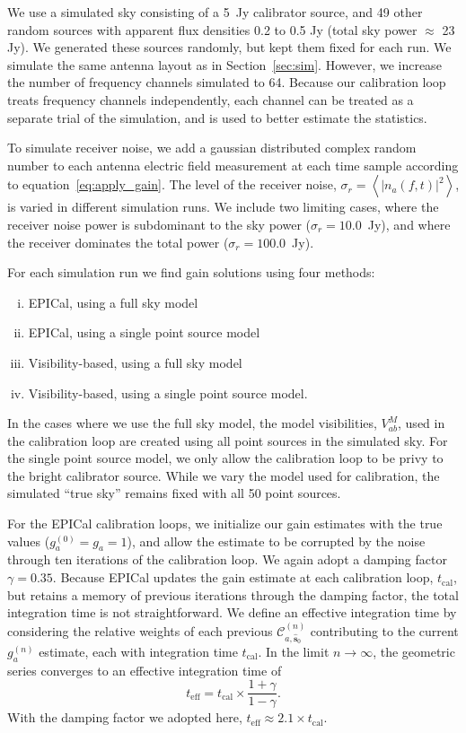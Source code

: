 \documentclass[a4paper,fleqn,usenatbib]{mnras}
\newcommand{\spix}{\ensuremath{\hat{\mathbf{s}}_{0}}}
\newcommand{\Cna}[1][n]{\ensuremath{\mathcal{C}^{(#1)}_{a,\spix}}}
\newcommand{\damp}{\ensuremath{\gamma}}
\newcommand{\tcal}{\ensuremath{t_{\mathrm{cal}}}}
\newcommand{\teff}{\ensuremath{t_{\mathrm{eff}}}}
\begin{document}
We use a simulated sky consisting of a 5~Jy calibrator source, and 49 other random sources 
with apparent flux densities 0.2 to 0.5 Jy (total sky power $\approx$ 23 Jy). We generated 
these sources randomly, but kept them fixed for each run. 
We simulate the same antenna layout as in Section~\ref{sec:sim}. 
However, we increase the number of frequency channels simulated to 64.
Because our calibration loop treats 
frequency channels independently, each channel can be treated as a separate trial of the 
simulation, and is used to better estimate the statistics.

To simulate receiver noise, we add a gaussian distributed complex random number to each 
antenna electric field measurement at each time sample according to 
equation~\ref{eq:apply_gain}. The level of the receiver noise, $\sigma_r = \left<\left|
n_a(f,t)\right|^2\right>$, is varied in different simulation runs. We include two limiting 
cases, where the receiver noise power is subdominant to the sky power ($\sigma_r = 
10.0$~Jy), and where the receiver dominates the total power ($\sigma_r=100.0$~Jy).

For each simulation run we find gain solutions using four methods:
\begin{enumerate}[i.]
\item EPICal, using a full sky model
\item EPICal, using a single point source model
\item Visibility-based, using a full sky model
\item Visibility-based, using a single point source model.
\end{enumerate}
In the cases where we use the full sky model, the model visibilities, $V^M_{ab}$, used in the 
calibration loop are created using all point sources in the simulated sky. For the single point 
source model, we only allow the calibration loop to be privy to the bright calibrator source. 
While we vary the model used for calibration, the simulated ``true sky'' remains fixed with all 50 
point sources.

For the EPICal calibration loops, we initialize our gain estimates with the true values 
(${g^{(0)}_a=g_a=1}$), and allow the estimate to be corrupted by the noise through ten 
iterations of the calibration loop. We again adopt a damping factor $\damp=0.35$. Because EPICal 
updates the gain estimate at each calibration loop, \tcal, but retains a memory of previous 
iterations through the damping factor, the total integration time is not straightforward. We define 
an effective integration time by considering the relative weights of each previous $\Cna$ 
contributing to the current $g^{(n)}_a$ estimate, each with integration time \tcal. In the limit $n
\rightarrow \infty$, the geometric series converges to an effective integration time of
\begin{equation}
\teff = \tcal \times \frac{1+\damp}{1-\damp}.
\end{equation}
With the damping factor we adopted here, $\teff \approx 2.1 \times \tcal$. 
\end{document}
